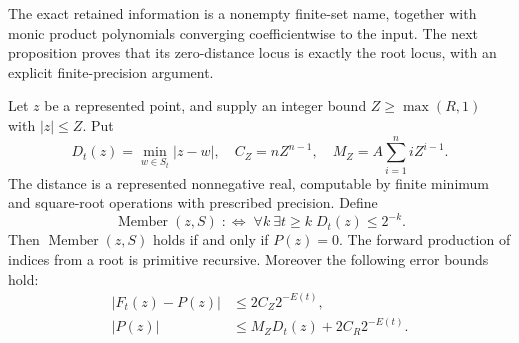 The exact retained information is a nonempty finite-set name, together
with monic product polynomials converging coefficientwise to the input.
The next proposition proves that its zero-distance locus is exactly the
root locus, with an explicit finite-precision argument.

\begin{proposition}
\label{prop:root-adequacy}
Let \(z\) be a represented point, and supply an integer bound
\(Z\ge\max(R,1)\) with \(|z|\le Z\). Put
\[
 D_t(z)=\min_{w\in S_t}|z-w|,\quad
 C_Z=nZ^{n-1},\quad
 M_Z=A\sum_{i=1}^n iZ^{i-1}.
\]
The distance is a represented nonnegative real, computable by finite
minimum and square-root operations with prescribed precision. Define
\[
 \operatorname{Member}(z,S)\;:\Longleftrightarrow\;
 \forall k\ \exists t\ge k\;D_t(z)\le2^{-k}.
\]
Then \(\operatorname{Member}(z,S)\) holds if and only if \(P(z)=0\).
The forward production of indices from a root is primitive recursive.
Moreover the following error bounds hold:
\begin{align}
 |F_t(z)-P(z)|&\le2C_Z2^{-E(t)},\label{eq:root-eval-error}\\
 |P(z)|&\le M_ZD_t(z)+2C_R2^{-E(t)}.
 \label{eq:root-distance-residual}
\end{align}
\end{proposition}


